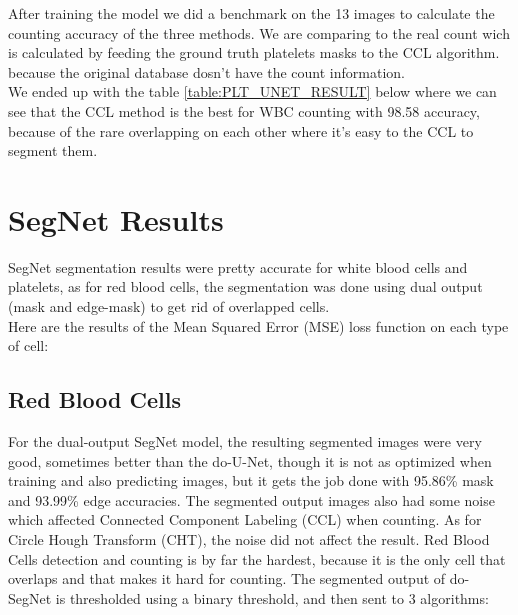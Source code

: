 After training the model we did a benchmark on the 13 images to calculate the counting accuracy of the three methods.
We are comparing to the real count wich is calculated by feeding the ground truth platelets masks to  the CCL algorithm. because the original database dosn't have the count information.\\
We ended up with the table \ref{table:PLT_UNET_RESULT} below where we can see that the CCL method is the best for WBC counting with 98.58 accuracy, because of the rare overlapping on each other where it’s easy to the CCL to segment them.



\section{SegNet Results}
\hspace{\parindent}
SegNet segmentation results were pretty accurate for white blood cells and platelets, as for red blood cells, the segmentation was done using dual output (mask and edge-mask) to get rid of overlapped cells.\\
Here are the results of the Mean Squared Error (MSE) loss function on each type of cell:



\subsection{Red Blood Cells}
\hspace{\parindent}
For the dual-output SegNet model, the resulting segmented images were very good, sometimes better than the do-U-Net, though it is not as optimized when training and also predicting images, but it gets the job done with 95.86\% mask and 93.99\% edge accuracies. The segmented output images also had some noise which affected Connected Component Labeling (CCL) when counting.
As for Circle Hough Transform (CHT), the noise did not affect the result.
Red Blood Cells detection and counting is by far the hardest, because it is the only cell that overlaps and that makes it hard for counting.
The segmented output of do-SegNet is thresholded using a binary threshold, and then sent to 3 algorithms:


